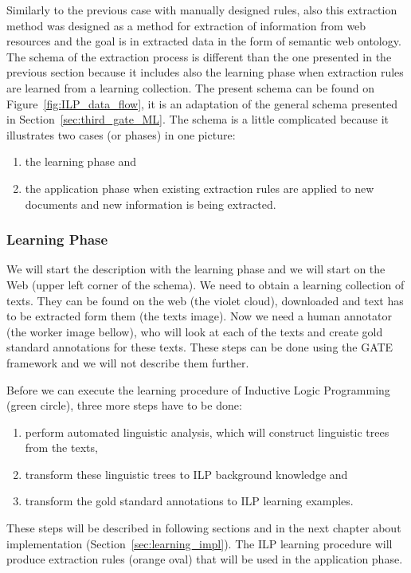 Similarly to the previous case with manually designed rules, also this extraction method was designed as a method for extraction of information from web resources and the goal is in extracted data in the form of semantic web ontology. The schema of the extraction process is different than the one presented in the previous section because it includes also the learning phase when extraction rules are learned from a learning collection. The present schema can be found on Figure~\ref{fig:ILP_data_flow}, it is an adaptation of the general schema presented in Section~\ref{sec:third_gate_ML}. The schema is a little complicated because it illustrates two cases (or phases) in one picture:
\begin{enumerate}
	\item the learning phase and
	\item the application phase when existing extraction rules are applied to new documents and new information is being extracted.
\end{enumerate}

\subsubsection{Learning Phase}
We will start the description with the learning phase and we will start on the Web (upper left corner of the schema). We need to obtain a learning collection of texts. They can be found on the web (the violet cloud), downloaded and text has to be extracted form them (the texts image). Now we need a human annotator (the worker image bellow), who will look at each of the texts and create gold standard annotations for these texts. These steps can be done using the GATE framework and we will not describe them further. 

Before we can execute the learning procedure of Inductive Logic Programming (green circle), three more steps have to be done:
\begin{enumerate}
	\item perform automated linguistic analysis, which will construct linguistic trees from the texts,
	\item transform these linguistic trees to ILP background knowledge and
	\item transform the gold standard annotations to ILP learning examples.
\end{enumerate}
These steps will be described in following sections and in the next chapter about implementation (Section~\ref{sec:learning_impl}). The ILP learning procedure will produce extraction rules (orange oval) that will be used in the application phase.

